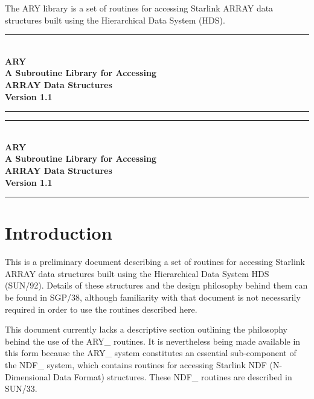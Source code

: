 \documentclass[twoside,11pt]{article}
\newcommand{\stardocinitials}  {SUN}
\newcommand{\stardocnumber}    {11.3}
\newcommand{\stardoctitle}     {ARY\\[2.5ex]
                                A Subroutine Library for Accessing\\
                                ARRAY Data Structures}
\newcommand{\stardocversion}   {Version 1.1}
\newcommand{\stardocabstract}  {%
The ARY library is a set of routines for accessing Starlink ARRAY data 
structures built using the Hierarchical Data System (HDS).
}
\newcommand{\stardocname}{\stardocinitials /\stardocnumber}
\newenvironment{latexonly}{}{}
\newcommand{\xref}[3]{#1}
\newcommand{\xlabel}[1]{}
\newcommand{\latexonlytoc}[0]{\tableofcontents}
\renewcommand{\thepage}{\roman{page}}
\begin{document}
\stardocabstract
  \newpage
  \begin{latexonly}
    \null\vspace {5mm}
    \begin {center}
    \rule{80mm}{0.5mm} \\ [1ex]
    {\Large\bf \stardoctitle \\ [2.5ex]
               \stardocversion} \\ [2ex]
    \rule{80mm}{0.5mm}
    \end{center}
    \setlength{\parskip}{0mm}
    \latexonlytoc
    \setlength{\parskip}{\medskipamount}
    \markboth{\stardocname}{\stardocname}
  \end{latexonly}
\cleardoublepage
\renewcommand{\thepage}{\arabic{page}}
\setcounter{page}{1}
\begin{latexonly}
\null\vspace {5mm}
\begin {center}
\rule{80mm}{0.5mm} \\ [1ex]
{\Large\bf \stardoctitle \\ [2.5ex]
           \stardocversion} \\ [2ex]
\rule{80mm}{0.5mm}
\end{center}
\end{latexonly}


\section{\xlabel{introduction}Introduction}
\label{introduction}

This is a preliminary document describing a set of routines for accessing
Starlink ARRAY data structures built using the Hierarchical Data System HDS
(\xref{SUN/92}{sun92}{}).  Details of these structures and the design
philosophy behind them can be found in \xref{SGP/38}{sgp38}{}, although
familiarity with that document is not necessarily required in order to
use the routines described here.

This document currently lacks a descriptive section outlining the
philosophy behind the use of the ARY\_ routines.  It is nevertheless
being made available in this form because the ARY\_ system constitutes
an essential sub-component of the NDF\_ system, which contains routines
for accessing Starlink NDF (N-Dimensional Data Format) structures.
These NDF\_ routines are described in \xref{SUN/33}{sun33}{}.
\end{document}
